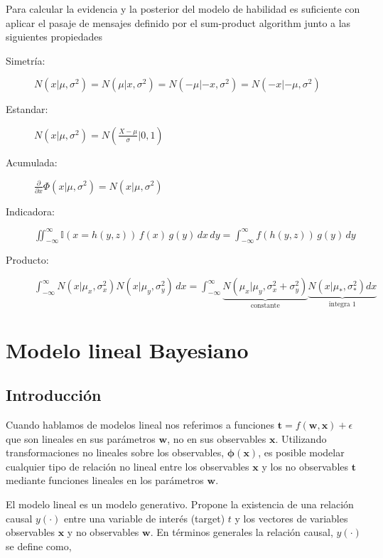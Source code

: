 \documentclass[a4paper,10pt]{article}
\begin{document}
 \vspace{0.25cm}

Para calcular la evidencia y la posterior del modelo de habilidad es suficiente con aplicar el pasaje de mensajes definido por el sum-product algorithm junto a las siguientes propiedades

\begin{description}
 \item[Simetr\'ia:]  $N(x|\mu,\sigma^2) = N(\mu|x,\sigma^2) = N(-\mu|-x,\sigma^2) = N(-x|-\mu,\sigma^2) $
 \item[Estandar:] $N(x|\mu,\sigma^2) = N( \frac{X-\mu}{\sigma} | 0,1)$
 \item[Acumulada:] $\frac{\partial}{\partial x} \Phi(x|\mu,\sigma^2) = N(x|\mu,\sigma^2)$
 \item[Indicadora:]  $\iint_{-\infty}^{\infty}  \mathbb{I}(x=h(y,z)) \, f(x) \,  g(y)\, dx\, dy = \int_{-\infty}^{\infty} f(h(y,z)) \, g(y) \, dy $
 \item[Producto:] $\int_{-\infty}^{\infty} N(x|\mu_x,\sigma_x^2)N(x|\mu_y,\sigma_y^2) \, dx  = \int_{-\infty}^{\infty}  \underbrace{N(\mu_x|\mu_y,\sigma_x^2+\sigma_y^2)}_{\text{constante}} \underbrace{ N(x|\mu_{*},\sigma_{*}^2) dx}_{\text{integra } 1} $
\end{description}


\section{Modelo lineal Bayesiano} \label{sec:lineal}

\subsection{Introducci\'on}

Cuando hablamos de modelos lineal nos referimos a funciones $\bm{t}= f(\bm{w},\bm{x}) + \epsilon $ que son lineales en sus parámetros $\bm{w}$, no en sus observables $\bm{x}$.
Utilizando transformaciones no lineales sobre los observables, $\bm{\phi}(\bm{x})$, es posible modelar cualquier tipo de relaci\'on no lineal entre los observables $\bm{x}$ y los no observables $\bm{t}$ mediante funciones lineales en los par\'ametros $\bm{w}$.

\vspace{0.3cm}

El modelo lineal es un modelo generativo. Propone la existencia de una relaci\'on causal $y(\cdot)$ entre una variable de inter\'es (target) $t$ y los vectores de variables observables $\bm{x}$ y no observables $\bm{w}$.
En t\'erminos generales la relaci\'on causal, $y(\cdot)$ se define como,
\end{document}
